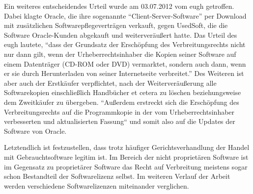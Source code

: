 Ein weiteres entscheidendes Urteil wurde am 03.07.2012 vom \gls{eugh} getroffen. Dabei klagte Oracle, die ihre sogenannte “Client-Server-Software” per Download mit zusätzlichen
Softwarepflegeverträgen verkauft, gegen UsedSoft, die die Software Oracle-Kunden abgekauft und weiterveräußert hatte. Das Urteil des \gls{eugh} lautete, “dass der Grundsatz der
Erschöpfung des Verbreitungsrechts nicht nur dann gilt, wenn der Urheberrechtsinhaber die Kopien seiner Software auf einem Datenträger (CD-ROM oder DVD) vermarktet, sondern auch dann,
wenn er sie durch Herunterladen von seiner Internetseite verbreitet.” Des Weiteren ist aber auch der Erstkäufer verpflichtet, nach der Weiterveräußerung alle Softwarekopien
einschließlich Handbücher et cetera zu löschen beziehungsweise dem Zweitkäufer zu übergeben. “Außerdem erstreckt sich die Erschöpfung des Verbreitungsrechts auf die
Programmkopie in der vom Urheberrechtsinhaber verbesserten und aktualisierten Fassung“ und somit also auf die Updates der Software von Oracle.

Letztendlich ist festzustellen, dass trotz häufiger Gerichtsverhandlung der Handel mit Gebrauchtsoftware legitim ist. Im Bereich der nicht proprietären Software
ist im Gegensatz zu proprietärer Software das Recht auf Verbreitung meistens sogar schon Bestandteil der Softwarelizenz selbst. Im weiteren Verlauf der Arbeit werden
verschiedene Softwarelizenzen miteinander verglichen.
